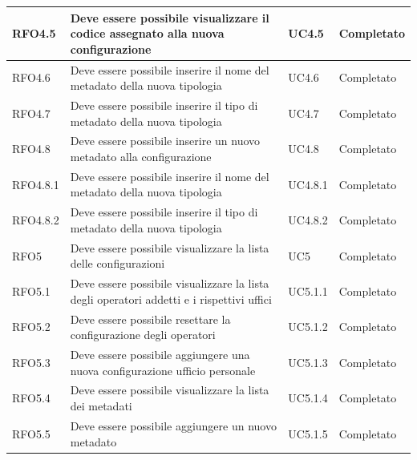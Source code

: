 \begin{longtable}{| p{3cm} | p{6cm} | p{3cm} | p{3cm} |}
        RFO4.5 & Deve essere possibile visualizzare il codice assegnato alla nuova configurazione & UC4.5 & Completato
        \\ \hline
        
        RFO4.6 & Deve essere possibile inserire il nome del metadato della nuova tipologia & UC4.6 & Completato
        \\ \hline
        
        RFO4.7 & Deve essere possibile inserire il tipo di metadato della nuova tipologia & UC4.7 & Completato
        \\ \hline
        
        RFO4.8 & Deve essere possibile inserire un nuovo metadato alla configurazione & UC4.8 & Completato
        \\ \hline
        
        RFO4.8.1 & Deve essere possibile inserire il nome del metadato della nuova tipologia & UC4.8.1 & Completato
        \\ \hline
        
        RFO4.8.2 & Deve essere possibile inserire il tipo di metadato della nuova tipologia & UC4.8.2 & Completato
        \\ \hline
        
        RFO5 & Deve essere possibile visualizzare la lista delle configurazioni & UC5 & Completato
        \\ \hline
        
        RFO5.1 & Deve essere possibile visualizzare la lista degli operatori addetti e i rispettivi uffici & UC5.1.1 & Completato
        \\ \hline
        
        RFO5.2 & Deve essere possibile resettare la configurazione degli operatori & UC5.1.2 & Completato
        \\ \hline
        
        RFO5.3 & Deve essere possibile aggiungere una nuova configurazione ufficio personale & UC5.1.3 & Completato
        \\ \hline
        
        RFO5.4 & Deve essere possibile visualizzare la lista dei metadati & UC5.1.4 & Completato
        \\ \hline
        
        RFO5.5 & Deve essere possibile aggiungere un nuovo metadato & UC5.1.5 & Completato
        \\ \hline
        

\end{longtable}
